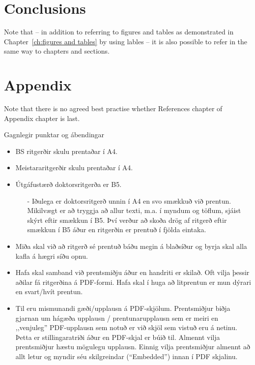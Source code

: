 \documentclass[a4paper,12pt,twoside,BCOR=10mm]{scrbook}
\begin{document}
\chapter{Conclusions}

Note that -- in addition to referring to figures and tables as
demonstrated in Chapter~\ref{ch:figures and tables} by using
lables -- it is also possible to refer in the same way to chapters and sections.

\printbibliography[ heading=bibintoc, title={References} ]

\appendix
\renewcommand{\chaptername}{Appendix}
\chapter{Appendix}

Note that there is no agreed best practise whether References chapter of Appendix chapter is last.

Gagnlegir punktar og ábendingar
\begin{itemize}
 \item BS ritgerðir skulu prentaðar í A4.
 \item Meistararitgerðir skulu prentaðar í A4.
 \item Útgáfustærð doktorsritgerða er B5.
\begin{itemize}
 \item[-] Iðulega er doktorsritgerð unnin í A4 en svo smækkuð við prentun. Mikilvægt er að tryggja að allur texti, m.a. í myndum og töflum, sjáist skýrt eftir smækkun í B5. Því verður að skoða drög af ritgerð eftir smækkun í B5 áður en ritgerðin er prentuð í fjölda eintaka.
\end{itemize}

\end{itemize}

\begin{itemize}
 \item Miða skal við að ritgerð sé prentuð báðu megin á blaðsíður og byrja skal alla kafla á hægri síðu opnu.
 \item Hafa skal samband við prentsmiðju áður en handriti er skilað. Oft vilja þessir aðilar fá ritgerðina á PDF-formi. Hafa skal í huga að litprentun er mun dýrari en svart/hvít prentun. 
 \item Til eru mismunandi gæði/upplausn á PDF-skjölum. Prentsmiðjur biðja gjarnan um hágæða upplausn / prentunarupplausn sem er meiri en ,,venjuleg” PDF-upplausn sem notuð er við skjöl sem vistuð eru á netinu. Þetta er stillingaratriði áður en PDF-skjal er búið til. Almennt vilja prentsmiðjur hæstu mögulegu upplausn. Einnig vilja prentsmiðjur almennt að allt letur og myndir séu skilgreindar (“Embedded”) innan í PDF skjalinu.
\end{itemize}
\end{document}
